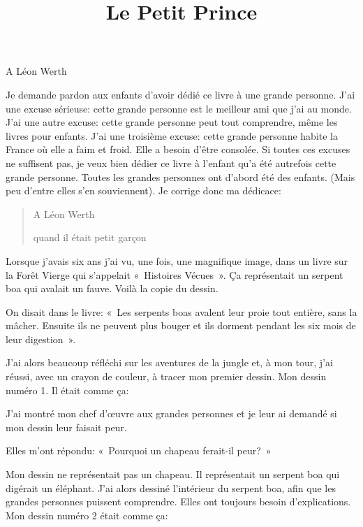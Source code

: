 \documentclass[a4paper]{report}
\title{Le Petit Prince}
\begin{document}
\sloppy

\begin{center}
    \Huge A Léon Werth
\end{center}

Je demande pardon aux enfants d'avoir dédié ce livre à une grande personne. J'ai une excuse sérieuse: cette grande personne est le meilleur ami que j'ai au monde. J'ai une autre excuse: cette grande personne peut tout comprendre, même les livres pour enfants. J'ai une troisième excuse: cette grande personne habite la France où elle a faim et froid. Elle a besoin d'être consolée. Si toutes ces excuses ne suffisent pas, je veux bien dédier ce livre à l'enfant qu'a été autrefois cette grande personne. Toutes les grandes personnes ont d'abord été des enfants. (Mais peu d'entre elles s'en souviennent). Je corrige donc ma dédicace:

\begin{quote}
    \centering
    A Léon Werth

    quand il était petit garçon
\end{quote}

\parachapter[I]{} %
Lorsque j'avais six ans j'ai vu, une fois, une magnifique image, dans un livre sur la Forêt Vierge qui s'appelait «~Histoires Vécues~». Ça représentait un serpent boa qui avalait un fauve. Voilà la copie du dessin.


On disait dans le livre: «~Les serpents boas avalent leur proie tout entière, sans la mâcher. Ensuite ils ne peuvent plus bouger et ils dorment pendant les six mois de leur digestion~».

J'ai alors beaucoup réfléchi sur les aventures de la jungle et, à mon tour, j'ai réussi, avec un crayon de couleur, à tracer mon premier dessin. Mon dessin numéro 1. Il était comme ça:


J'ai montré mon chef d'œuvre aux grandes personnes et je leur ai demandé si mon dessin leur faisait peur.

Elles m'ont répondu: «~Pourquoi un chapeau ferait-il peur?~»

Mon dessin ne représentait pas un chapeau. Il représentait un serpent boa qui digérait un éléphant. J'ai alors dessiné l'intérieur du serpent boa, afin que les grandes personnes puissent comprendre. Elles ont toujours besoin d'explications. Mon dessin numéro 2 était comme ça:
\end{document}

